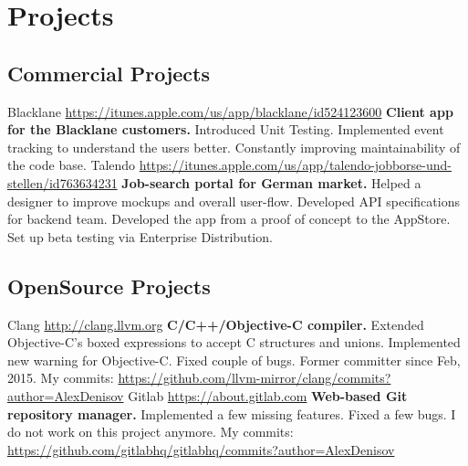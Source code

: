 \documentclass[11pt,a4paper]{moderncv}
\begin{document}
\maketitle

\section{Projects}
  \subsection{Commercial Projects}
  \cvline
    {Blacklane}
    {\url{https://itunes.apple.com/us/app/blacklane/id524123600}\newline{}
    \textbf{Client app for the Blacklane customers.}\newline{}
    Introduced Unit Testing.\newline{}
    Implemented event tracking to understand the users better.\newline{}
    Constantly improving maintainability of the code base.}
  \cvline
    {Talendo}
    {\url{https://itunes.apple.com/us/app/talendo-jobborse-und-stellen/id763634231}\newline{}
    \textbf{Job-search portal for German market.}\newline{}
    Helped a designer to improve mockups and overall user-flow.\newline{}
    Developed API specifications for backend team.\newline{}
    Developed the app from a proof of concept to the AppStore.\newline{}
    Set up beta testing via Enterprise Distribution.}
  \subsection{OpenSource Projects}
  \cvline
    {Clang}
    {\url{http://clang.llvm.org}\newline{}
    \textbf{C/C++/Objective-C compiler.}\newline{}
    Extended Objective-C's boxed expressions to accept C structures and unions.\newline{}
    Implemented new warning for Objective-C.\newline{}
    Fixed couple of bugs.\newline{}
    Former committer since Feb, 2015.\newline{}
    My commits:\newline{}
    \url{https://github.com/llvm-mirror/clang/commits?author=AlexDenisov}
    }
  \cvline
    {Gitlab}
    {\url{https://about.gitlab.com}\newline{}
    \textbf{Web-based Git repository manager.}\newline{}
    Implemented a few missing features.\newline{}
    Fixed a few bugs.\newline{}
    I do not work on this project anymore.\newline{}
    My commits:\newline{}
    \url{https://github.com/gitlabhq/gitlabhq/commits?author=AlexDenisov}
    }
\end{document}
